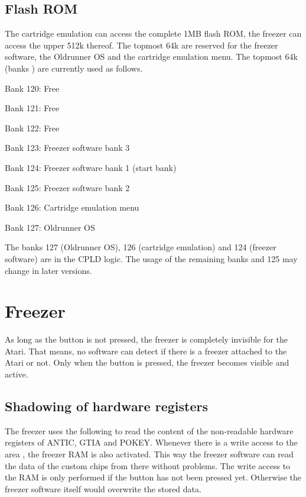 \subsection{Flash ROM}
The cartridge emulation can access the complete 1MB flash ROM, the freezer can
access the upper 512k thereof. The topmost 64k are reserved for the freezer
software, the Oldrunner OS and the cartridge emulation menu. The topmost 64k
(banks ) are currently used as follows.

\clearpage

\begin{itemize*}
\item Bank 120: Free
\item Bank 121: Free
\item Bank 122: Free
\item Bank 123: Freezer software bank 3
\item Bank 124: Freezer software bank 1 (start bank)
\item Bank 125: Freezer software bank 2
\item Bank 126: Cartridge emulation menu
\item Bank 127: Oldrunner OS
\end{itemize*}

The banks 127 (Oldrunner OS), 126 (cartridge emulation) and 124 (freezer
software) are  in the CPLD logic. The usage of the remaining
banks  and 125 may change in later versions.

\section{Freezer}
As long as the  button is not pressed, the freezer is completely
invisible for the Atari. That means, no software can detect if there is a
freezer attached to the Atari or not. Only when the button is pressed, the
freezer becomes visible and active.

\subsection{Shadowing of hardware registers}

The freezer uses the following  to read the content of the
non-readable hardware registers of ANTIC, GTIA and POKEY. Whenever there is a
write access to the area , the freezer RAM is also activated.
This way the freezer software can read the data of the custom chips from there
without problems. The write access to the RAM is only performed if the
 button has not been pressed yet. Otherwise the freezer software
itself would overwrite the stored data.

